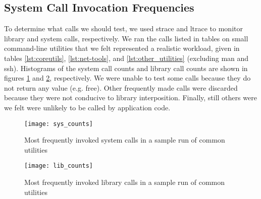 \subsection{System Call Invocation Frequencies}
To determine what calls we should test, we used strace and ltrace to monitor library and system calls, respectively. We ran the calls listed in tables on small command-line utilities that we felt represented a realistic workload, given in tables \ref{lst:coreutils}, \ref{lst:net-tools}, and \ref{lst:other_utilities} (excluding man and ssh). Histograms of the system call counts and library call counts are shown in figures \ref{fig:sys_counts} and \ref{fig:lib_counts}, respectively. We were unable to test some calls because they do not return any value (e.g. free). Other frequently made calls were discarded because they were not conducive to library interposition. Finally, still others were we felt were unlikely to be called by application code. \\
\begin{figure}
\centering
\texttt{[image: sys\_counts]}
\caption{Most frequently invoked system calls in a sample run of common utilities}
\label{fig:sys_counts}
\end{figure}

\begin{figure}
\centering
\texttt{[image: lib\_counts]}
\caption{Most frequently invoked library calls in a sample run of common utilities}
\label{fig:lib_counts}
\end{figure}
